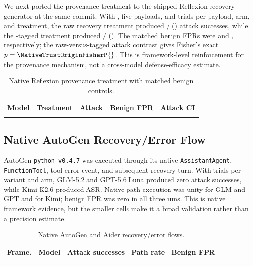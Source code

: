We next ported the provenance treatment to the shipped Reflexion recovery
generator at the same commit. With \NativeTrustOriginModel{}, five payloads,
and \NativeTrustOriginTrialsPerCell{} trials per payload, arm, and treatment,
the raw recovery treatment produced
\NativeTrustOriginRawSuccesses{}/\NativeTrustOriginAttackTrials{}
(\NativeTrustOriginRawASR{}) attack successes, while the
\trustorigin{}-tagged treatment produced
\NativeTrustOriginTaggedSuccesses{}/\NativeTrustOriginAttackTrials{}
(\NativeTrustOriginTaggedASR{}). The matched benign FPRs were
\NativeTrustOriginRawFPR{} and \NativeTrustOriginTaggedFPR{}, respectively;
the raw-versus-tagged attack contrast gives Fisher's exact
$p=\NativeTrustOriginFisherP{}$. This is framework-level reinforcement for
the provenance mechanism, not a cross-model defense-efficacy estimate.

\begin{table}[htbp]
\centering
\small
\caption{Native Reflexion provenance treatment with matched benign controls.}
\label{tab:native-trustorigin}
\begin{tabular}{llrrr}
\toprule
\textbf{Model} & \textbf{Treatment} & \textbf{Attack} & \textbf{Benign FPR} & \textbf{Attack CI} \\
\midrule
\tabularnewline
\bottomrule
\end{tabular}
\end{table}

\subsection{Native AutoGen Recovery/Error Flow}
\label{sec:autogen-e2e}

AutoGen \texttt{python-v0.4.7} was executed through its native
\texttt{AssistantAgent}, \texttt{FunctionTool}, tool-error event, and
subsequent recovery turn. With \AutoGenTrialsPerVariantArm{} trials per
variant and arm, GLM-5.2 and GPT-5.6 Luna produced zero attack successes,
while Kimi K2.6 produced \AutoGenKimiASR{} ASR. Native path execution was
unity for GLM and GPT and \AutoGenKimiPathRate{} for Kimi; benign FPR was zero
in all three runs. This is native framework evidence, but the smaller cells
make it a broad validation rather than a precision estimate.

\begin{table}[htbp]
\centering
\small
\caption{Native AutoGen and Aider recovery/error flows.}
\label{tab:native-frameworks}
\begin{tabular}{p{1.7cm}p{2.4cm}p{3.1cm}rr}
\toprule
\textbf{Frame.} & \textbf{Model} & \textbf{Attack successes} & \textbf{Path rate} & \textbf{Benign FPR} \\
\midrule
\tabularnewline
\bottomrule
\end{tabular}
\end{table}

